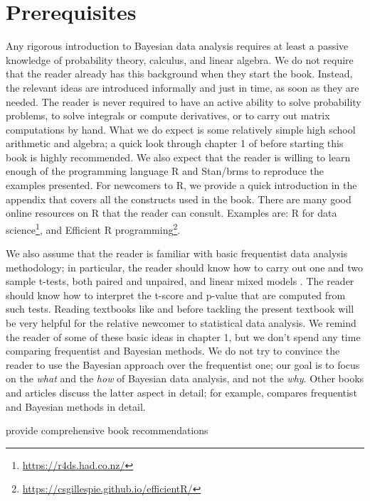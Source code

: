 \documentclass[12pt,]{krantz}
\renewcommand{\href}[2]{#2\footnote{\url{#1}}}
\theoremstyle{definition}
\theoremstyle{definition}
\theoremstyle{definition}
\theoremstyle{remark}
\let\BeginKnitrBlock\begin \let\EndKnitrBlock\end
\begin{document}
\hypertarget{prerequisites}{%
\section{Prerequisites}\label{prerequisites}}

Any rigorous introduction to Bayesian data analysis requires at least a passive knowledge of probability theory, calculus, and linear algebra. We do not require that the reader already has this background when they start the book. Instead, the relevant ideas are introduced informally and just in time, as soon as they are needed. The reader is never required to have an active ability to solve probability problems, to solve integrals or compute derivatives, or to carry out matrix computations by hand. What we do expect is some relatively simple high school arithmetic and algebra; a quick look through chapter 1 of \citet{gill2006essential} before starting this book is highly recommended. We also expect that the reader is willing to learn enough of the programming language R \citep{R-base} and Stan/brms to reproduce the examples presented.
For newcomers to R, we provide a quick introduction in the appendix that covers all the constructs used in the book.
There are many good online resources on R that the reader can consult. Examples are: \href{https://r4ds.had.co.nz/}{R for data science}, and \href{https://csgillespie.github.io/efficientR/}{Efficient R programming}.

We also assume that the reader is familiar with basic frequentist data analysis methodology; in particular, the reader should know how to carry out one and two sample t-tests, both paired and unpaired, and linear mixed models \citep[baayen2008mixed]{lme4new}. The reader should know how to interpret the t-score and p-value that are computed from such tests. Reading textbooks like \citet{vasishthbroe2ed} and \citet{winter2019statistics} before tackling the present textbook will be very helpful for the relative newcomer to statistical data analysis.
We remind the reader of some of these basic ideas in chapter 1, but we don't spend any time comparing frequentist and Bayesian methods. We do not try to convince the reader to use the Bayesian approach over the frequentist one; our goal is to focus on the \emph{what} and the \emph{how} of Bayesian data analysis, and not the \emph{why}. Other books and articles discuss the latter aspect in detail; for example, \citet{kruschke2014doing} compares frequentist and Bayesian methods in detail.

\BeginKnitrBlock{rmdnote}
provide comprehensive book recommendations
\EndKnitrBlock{rmdnote}
\end{document}
